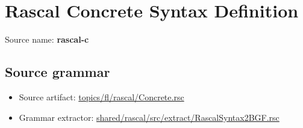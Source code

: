 \chapter{Rascal Concrete Syntax Definition}

 Source name: \textbf{rascal-c}

\section{Source grammar}

\begin{itemize}\item Source artifact: \href{http://github.com/grammarware/slps/blob/master/topics/fl/rascal/Concrete.rsc}{topics/fl/rascal/Concrete.rsc}\item Grammar extractor: \href{http://github.com/grammarware/slps/blob/master/shared/rascal/src/extract/RascalSyntax2BGF.rsc}{shared/rascal/src/extract/RascalSyntax2BGF.rsc}\end{itemize}

